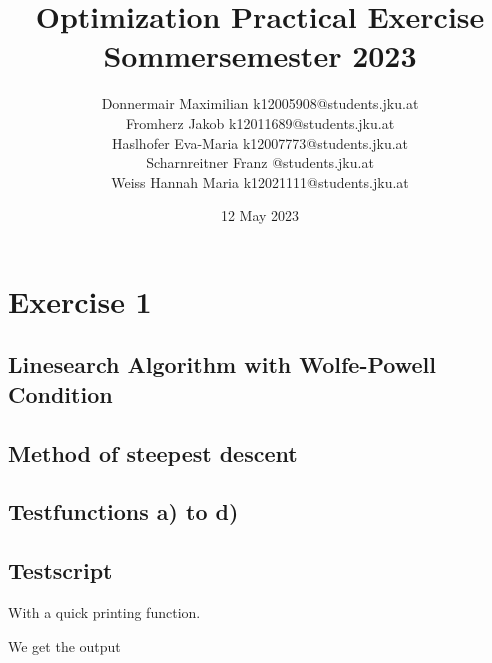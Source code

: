 \documentclass{article}
\title{Optimization Practical Exercise \\ Sommersemester 2023}
\author{Donnermair Maximilian k12005908@students.jku.at\\ Fromherz Jakob k12011689@students.jku.at\\Haslhofer Eva-Maria  k12007773@students.jku.at \\ Scharnreitner Franz @students.jku.at\\ Weiss Hannah Maria k12021111@students.jku.at } %
\date{12 May 2023}
\begin{document}
	\maketitle
	
	\newpage
	
	\section{Exercise 1}
	
	\subsection{Linesearch Algorithm with Wolfe-Powell Condition}
	
	
	\subsection{Method of steepest descent}
	
	
	
	\subsection{Testfunctions a) to d)}
	
	
	
	
	
	
	
	
	\subsection{Testscript}
	
	
	With a quick printing function.
	
	
	We get the output
	
\end{document}
